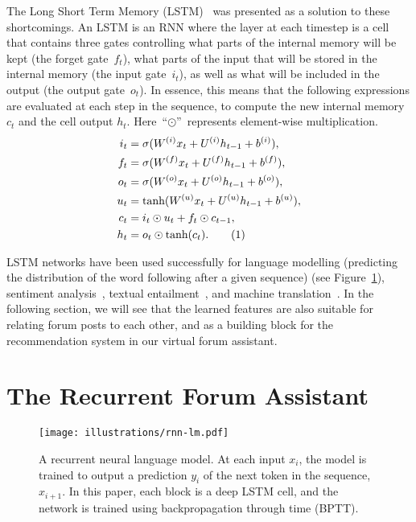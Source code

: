 \documentclass[11pt]{article}
\newcommand\numberthis{\addtocounter{equation}{1}\tag{\theequation}}
\begin{document}
The Long Short Term Memory (LSTM)~\cite{schmidhuber1997long} was presented as a solution to these shortcomings. An LSTM is an RNN where the layer at each timestep is a cell that contains three gates controlling what parts of the internal memory will be kept (the forget gate~$f_t$), what parts of the input that will be stored in the internal memory (the input gate~$i_t$), as well as what will be included in the output (the output gate~$o_t$). In essence, this means that the following expressions are evaluated at each step in the sequence, to compute the new internal memory $c_t$ and the cell output $h_t$. Here~``$\odot$''~represents element-wise multiplication.
\begin{align*}
i_t &= \sigma(W^{(i)} x_t + U^{(i)} h_{t-1} + b^{(i)}), \\
f_t &= \sigma(W^{(f)} x_t + U^{(f)} h_{t-1} + b^{(f)}),\\
o_t &= \sigma(W^{(o)} x_t + U^{(o)} h_{t-1} + b^{(o)}),\\
u_t &= \mbox{tanh}(W^{(u)} x_t + U^{(u)} h_{t-1} + b^{(u)}),\\
c_t &= i_t \odot u_t + f_t \odot c_{t-1},\\
h_t &= o_t \odot \mbox{tanh}(c_t). \numberthis \label{eqn:lstm} \\
\end{align*}

LSTM networks have been used successfully for language modelling (predicting the distribution of the word following after a given sequence) (see Figure~\ref{fig:rnn-lm}), sentiment analysis~\cite{tang2015document}, textual entailment~\cite{rocktaschel2016reasoning}, and machine translation~\cite{sutskever2014sequence}. In the following section, we will see that the learned features are also suitable for relating forum posts to each other, and as a building block for the recommendation system in our virtual forum assistant.

\section{The Recurrent Forum Assistant}
\label{sec:recurrent-forum-assistant}

\begin{figure}[t]
  \texttt{[image: illustrations/rnn-lm.pdf]}
  \caption{A recurrent neural language model. At each input $x_i$, the model is trained to output a prediction $y_i$ of the next token in the sequence, $x_{i+1}$. In this paper, each block is a deep LSTM cell, and the network is trained using backpropagation through time (BPTT).}
  \label{fig:rnn-lm}
\end{figure}
\end{document}
